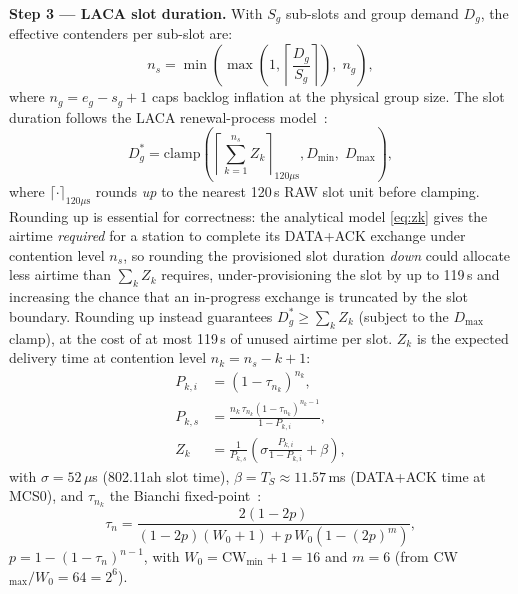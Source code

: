 \documentclass[journal]{IEEEtran}
\begin{document}
\textbf{Step 3 --- LACA slot duration.}
With $S_g$ sub-slots and group demand $D_g$, the effective contenders
per sub-slot are:
\begin{equation}
  n_s = \min\!\left(\max\!\left(1,\left\lceil\frac{D_g}{S_g}\right\rceil
    \right),\;n_g\right),
  \label{eq:ns}
\end{equation}
where $n_g\!=\!e_g\!-\!s_g\!+\!1$ caps backlog inflation at the
physical group size.
The slot duration follows the LACA renewal-process
model~\cite{taramit2023}:
\begin{equation}
  D_g^* = \mathrm{clamp}\!\left(
    \left\lceil\sum_{k=1}^{n_s}Z_k\right\rceil_{120\mu\text{s}},
    D_\mathrm{min},\;D_\mathrm{max}\right),
  \label{eq:laca}
\end{equation}
where $\lceil\cdot\rceil_{120\mu\text{s}}$ rounds \emph{up} to the
nearest 120\,\textmu{}s RAW slot unit before clamping.
Rounding up is essential for correctness: the analytical model
\eqref{eq:zk} gives the airtime \emph{required} for a station to
complete its DATA+ACK exchange under contention level $n_s$, so
rounding the provisioned slot duration \emph{down} could allocate less
airtime than $\sum_k Z_k$ requires, under-provisioning the slot by up
to 119\,\textmu{}s and increasing the chance that an in-progress
exchange is truncated by the slot boundary.
Rounding up instead guarantees $D_g^*\!\geq\!\sum_k Z_k$ (subject to the
$D_\mathrm{max}$ clamp), at the cost of at most 119\,\textmu{}s of
unused airtime per slot.
$Z_k$ is the expected delivery time at contention
level $n_k\!=\!n_s\!-\!k\!+\!1$:
\begin{align}
  P_{k,i} &= (1-\tau_{n_k})^{n_k},
  \label{eq:pidle}\\
  P_{k,s} &= \frac{n_k\,\tau_{n_k}(1-\tau_{n_k})^{n_k-1}}{1-P_{k,i}},
  \label{eq:psucc}\\
  Z_k     &= \frac{1}{P_{k,s}}\left(\sigma\frac{P_{k,i}}{1-P_{k,i}}
             +\beta\right),
  \label{eq:zk}
\end{align}
with $\sigma\!=\!52\,\mu$s (802.11ah slot time), $\beta\!=\!T_S\!\approx
\!11.57$\,ms (DATA+ACK time at MCS0), and $\tau_{n_k}$ the Bianchi
fixed-point~\cite{bianchi2000}:
\begin{equation}
  \tau_n = \frac{2(1-2p)}{(1-2p)(W_0+1)+p\,W_0(1-(2p)^m)},
  \label{eq:bianchi}
\end{equation}
$p\!=\!1\!-\!(1\!-\!\tau_n)^{n-1}$, with $W_0\!=\!\mathrm{CW}_\mathrm{min}+1\!=\!16$
and $m\!=\!6$ (from CW$_\mathrm{max}/W_0\!=\!64\!=\!2^6$).
\end{document}
